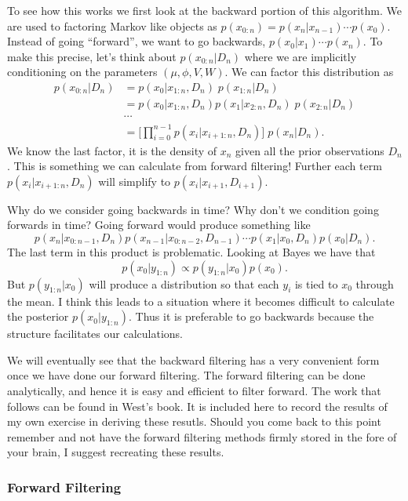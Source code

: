 \documentclass{article}
\begin{document}
To see how this works we first look at the backward portion of this algorithm.  We are used to factoring Markov like objects as $p(x_{0:n}) = p(x_n | x_{n-1}) \cdots p(x_0)$.  Instead of going ``forward'', we want to go backwards, $p(x_0 | x_1) \cdots p(x_n)$.  To make this precise, let's think about $p(x_{0:n} | D_n)$ where we are implicitly conditioning on the parameters $(\mu, \phi, V, W)$.  We can factor this distribution as
\begin{align*}
p(x_{0:n} | D_n) & = p(x_0 | x_{1:n}, D_n) \; p(x_{1:n} | D_n) \\
& = p(x_0 | x_{1:n}, D_n) p(x_1 | x_{2:n}, D_n) \; p(x_{2:n} | D_n) \\
& \cdots \\
& = \Big[ \prod_{i=0}^{n-1} p(x_i | x_{i+1:n}, D_n) \Big] \; p(x_n | D_n).
\end{align*}
We know the last factor, it is the density of $x_n$ given all the prior observations $D_n$.  This is something we can calculate from forward filtering!  Further each term $p(x_i | x_{i+1:n}, D_n)$ will simplify to $p(x_i | x_{i+1}, D_{i+1})$.

Why do we consider going backwards in time?  Why don't we condition going forwards in time?  Going forward would produce something like
\[
p(x_n | x_{0:n-1}, D_n) p(x_{n-1} | x_{0:n-2}, D_{n-1}) \cdots p(x_1 | x_0, D_n) p(x_0 | D_n).
\]
The last term in this product is problematic.  Looking at Bayes we have that
\[
p(x_0 | y_{1:n}) \propto p(y_{1:n} | x_0) p(x_0).
\]
But $p(y_{1:n} | x_0)$ will produce a distribution so that each $y_i$ is tied to $x_0$ through the mean.  I think this leads to a situation where it becomes difficult to calculate the posterior $p(x_0 | y_{1:n})$.  Thus it is preferable to go backwards because the structure facilitates our calculations.  

We will eventually see that the backward filtering has a very convenient form once we have done our forward filtering.  The forward filtering can be done analytically, and hence it is easy and efficient to filter forward.  The work that follows can be found in West's book.  It is included here to record the results of my own exercise in deriving these resutls.  Should you come back to this point remember and not have the forward filtering methods firmly stored in the fore of your brain, I suggest recreating these results.


\subsubsection{Forward Filtering}
\end{document}

